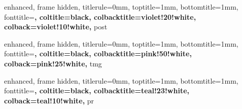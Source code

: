 

{
    enhanced,
    frame hidden,
    titlerule=0mm,
    toptitle=1mm,
    bottomtitle=1mm,
    fonttitle=\bfseries\large,
    coltitle=black,
    colbacktitle=violet!20!white,
    colback=violet!10!white,
}{post}



{
    enhanced,
    frame hidden,
    titlerule=0mm,
    toptitle=1mm,
    bottomtitle=1mm,
    fonttitle=\bfseries\large,
    coltitle=black,
    colbacktitle=pink!50!white,
    colback=pink!25!white,
}{tmg}



{
    enhanced,
    frame hidden,
    titlerule=0mm,
    toptitle=1mm,
    bottomtitle=1mm,
    fonttitle=\bfseries\large,
    coltitle=black,
    colbacktitle=teal!23!white,
    colback=teal!10!white,
}{pr}


